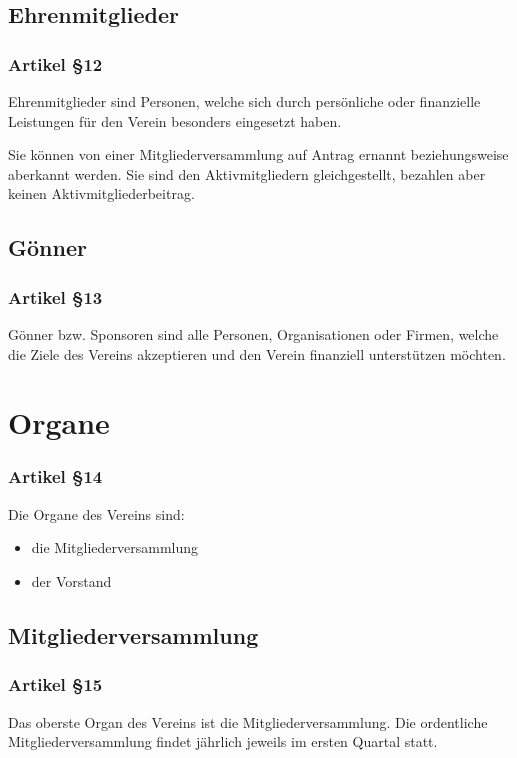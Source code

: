 \documentclass[a4paper,
               10pt,
               fleqn]{article}
\begin{document}
\subsection{Ehrenmitglieder}

\subsubsection*{Artikel §12}
Ehrenmitglieder sind Personen, welche sich durch persönliche
oder finanzielle Leistungen für den Verein besonders
eingesetzt haben.

Sie können von einer Mitgliederversammlung auf Antrag 
ernannt beziehungsweise aberkannt werden. Sie sind den
Aktivmitgliedern gleichgestellt, bezahlen aber keinen
Aktivmitgliederbeitrag.

\subsection{Gönner}

\subsubsection*{Artikel §13}
Gönner bzw. Sponsoren sind alle Personen, Organisationen 
oder Firmen, welche die Ziele des Vereins akzeptieren und
den Verein finanziell unterstützen möchten.

\section{Organe}

\subsubsection*{Artikel §14}
Die Organe des Vereins sind:
\begin{itemize}
\item die Mitgliederversammlung
\item der Vorstand
\end{itemize}

\subsection{Mitgliederversammlung}

\subsubsection*{Artikel §15}
Das oberste Organ des Vereins ist die Mitgliederversammlung.
 Die ordentliche Mitgliederversammlung findet jährlich
jeweils im ersten Quartal statt.
\end{document}
